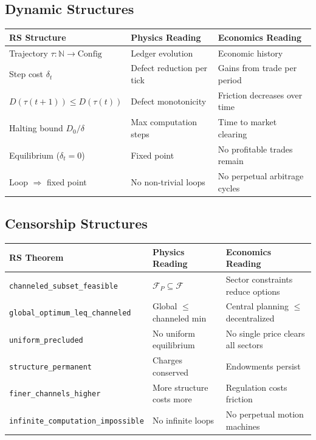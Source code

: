 \documentclass[11pt,a4paper]{article}
\theoremstyle{plain}
\theoremstyle{definition}
\theoremstyle{remark}
\newcommand{\N}{\mathbb{N}}
\newcommand{\F}{\mathcal{F}}
\begin{document}
\subsection{Dynamic Structures}

\begin{center}
\renewcommand{\arraystretch}{1.3}
\begin{tabular}{@{}p{4cm}p{5cm}p{5cm}@{}}
\toprule
\textbf{RS Structure} & \textbf{Physics Reading} & \textbf{Economics Reading} \\
\midrule
Trajectory $\tau : \N \to \mathrm{Config}$ & Ledger evolution & Economic history \\
Step cost $\delta_t$ & Defect reduction per tick & Gains from trade per period \\
$D(\tau(t{+}1)) \le D(\tau(t))$ & Defect monotonicity & Friction decreases over time \\
Halting bound $D_0/\delta$ & Max computation steps & Time to market clearing \\
Equilibrium ($\delta_t = 0$) & Fixed point & No profitable trades remain \\
Loop $\Rightarrow$ fixed point & No non-trivial loops & No perpetual arbitrage cycles \\
\bottomrule
\end{tabular}
\end{center}

\subsection{Censorship Structures}

\begin{center}
\renewcommand{\arraystretch}{1.3}
\begin{tabular}{@{}p{4cm}p{5cm}p{5cm}@{}}
\toprule
\textbf{RS Theorem} & \textbf{Physics Reading} & \textbf{Economics Reading} \\
\midrule
\texttt{channeled\_subset\_feasible} & $\F_P \subseteq \F$ & Sector constraints reduce options \\
\texttt{global\_optimum\_leq\_channeled} & Global $\le$ channeled min & Central planning $\le$ decentralized \\
\texttt{uniform\_precluded} & No uniform equilibrium & No single price clears all sectors \\
\texttt{structure\_permanent} & Charges conserved & Endowments persist \\
\texttt{finer\_channels\_higher} & More structure costs more & Regulation costs friction \\
\texttt{infinite\_computation\_impossible} & No infinite loops & No perpetual motion machines \\
\bottomrule
\end{tabular}
\end{center}
\end{document}
